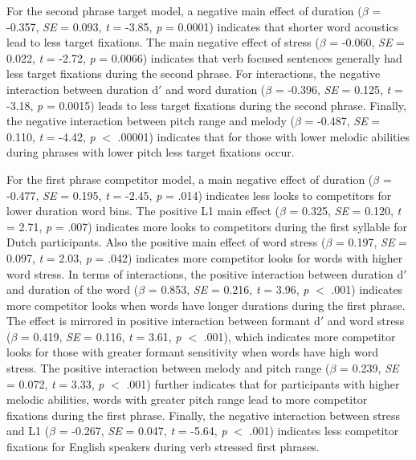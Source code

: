  For the second phrase target model, a negative main effect of duration ($\beta$ = -0.357, \textit{SE} = 0.093, \textit{t} = -3.85, \textit{p} = 0.0001) indicates that shorter word acoustics lead to less target fixations. The main negative effect of stress ($\beta$ = -0.060, \textit{SE} = 0.022, \textit{t} = -2.72, \textit{p} = 0.0066) indicates that verb focused sentences generally had less target fixations during the second phrase. For interactions, the negative interaction between duration d$'$ and word duration ($\beta$ = -0.396, \textit{SE} = 0.125, \textit{t} = -3.18, \textit{p} = 0.0015) leads to less target fixations during the second phrase. Finally, the negative interaction between pitch range and melody ($\beta$ = -0.487, \textit{SE} = 0.110, \textit{t} = -4.42, \textit{p} $<$ .00001) indicates that for those with lower melodic abilities during phrases with lower pitch less target fixations occur.

 For the first phrase competitor model, a main negative effect of duration ($\beta$ = -0.477, \textit{SE} = 0.195, \textit{t} = -2.45, \textit{p} = .014) indicates less looks to competitors for lower duration word bins. The positive L1 main effect ($\beta$ = 0.325, \textit{SE} = 0.120, \textit{t} = 2.71, \textit{p} = .007) indicates more looks to competitors during the first syllable for Dutch participants. Also the positive main effect of word stress ($\beta$ = 0.197, \textit{SE} = 0.097, \textit{t} = 2.03, \textit{p} = .042) indicates more competitor looks for words with higher word stress. In terms of interactions, the positive interaction between duration d$'$ and duration of the word ($\beta$ = 0.853, \textit{SE} = 0.216, \textit{t} = 3.96, \textit{p} $<$ .001) indicates more competitor looks when words have longer durations during the first phrase. The effect is mirrored in positive interaction between formant d$'$ and word stress ($\beta$ = 0.419, \textit{SE} = 0.116, \textit{t} = 3.61, \textit{p} $<$ .001), which indicates more competitor looks for those with greater formant sensitivity when words have high word stress. The positive interaction between melody and pitch range ($\beta$ = 0.239, \textit{SE} = 0.072, \textit{t} = 3.33, \textit{p} $<$ .001) further indicates that for participants with higher melodic abilities, words with greater pitch range lead to more competitor fixations during the first phrase. Finally, the negative interaction between stress and L1 ($\beta$ = -0.267, \textit{SE} = 0.047, \textit{t} = -5.64, \textit{p} $<$ .001) indicates less competitor fixations for English speakers during verb stressed first phrases.


